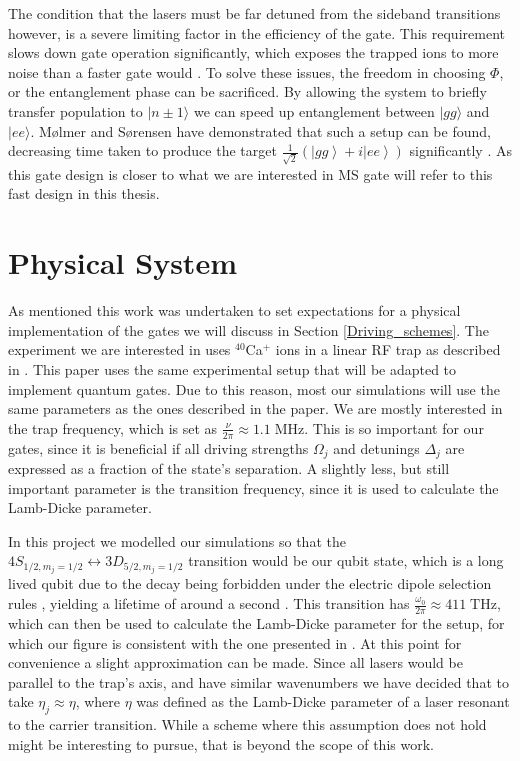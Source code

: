 \documentclass[12pt,twoside]{report}
\begin{document}
The condition that the lasers must be far detuned from the sideband transitions however, is a severe limiting factor in the efficiency of the gate. This requirement slows down gate operation significantly, which exposes the trapped ions to more noise than a faster gate would \cite{Trapped_ion_qbit_toolbox}. To solve these issues, the freedom in choosing $\Phi$, or the entanglement phase can be sacrificed. By allowing the system to briefly transfer population to $|n\pm 1\rangle$ we can speed up entanglement between $|gg\rangle$ and $|ee\rangle$. M\o lmer and S\o rensen have demonstrated that such a setup can be found, decreasing time taken to produce the target $\frac{1}{\sqrt{2}}\left(\left|gg\right\rangle + i\left|ee\right\rangle\right)$ significantly \cite{Fast_MS}. As this gate design is closer to what we are interested in MS gate will refer to this fast design in this thesis.

\section{Physical System}
\label{Background:PhysSys}

As mentioned this work was undertaken to set expectations for a physical implementation of the gates we will discuss in Section \ref{Driving_schemes}. The experiment we are interested in uses $^{40}$Ca$^+$ ions in a linear RF trap as described in \cite{Experiment_setup}. This paper uses the same experimental setup that will be adapted to implement quantum gates. Due to this reason, most our simulations will use the same parameters as the ones described in the paper. We are mostly interested in the trap frequency, which is set as $\frac{\nu}{2\pi} \approx 1.1\;\mathrm{MHz}$. This is so important for our gates, since it is beneficial if all driving strengths $\Omega_j$ and detunings $\Delta_j$ are expressed as a fraction of the state's separation. A slightly less, but still important parameter is the transition frequency, since it is used to calculate the Lamb-Dicke parameter.

In this project we modelled our simulations so that the $4S_{1/2,m_j=1/2} \leftrightarrow 3D_{5/2,m_j=1/2}$ transition would be our qubit state, which is a long lived qubit due to the decay being forbidden under the electric dipole selection rules \cite{Foot}, yielding a lifetime of around a second \cite{Ca_lifetime}. This transition has $\frac{\omega_0}{2\pi} \approx 411\;\mathrm{THz}$, which can then be used to calculate the Lamb-Dicke parameter for the setup, for which our figure is consistent with the one presented in \cite{Experiment_setup}. At this point for convenience a slight approximation can be made. Since all lasers would be parallel to the trap's axis, and have similar wavenumbers we have decided that to take ${\eta_j \approx \eta}$, where $\eta$ was defined as the Lamb-Dicke parameter of a laser resonant to the carrier transition. While a scheme where this assumption does not hold might be interesting to pursue, that is beyond the scope of this work. 
\end{document}

